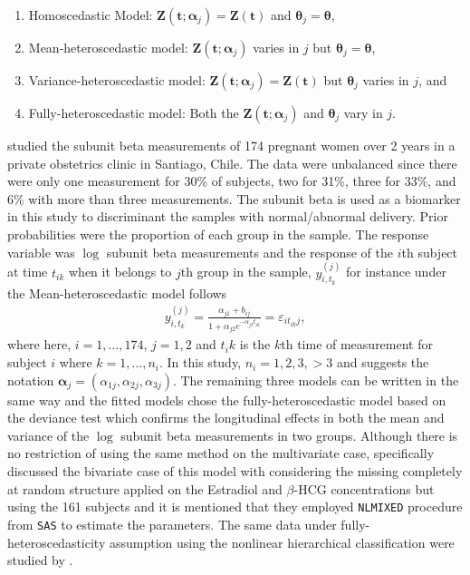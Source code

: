 \documentclass[]{article}
\begin{document}
		\begin{enumerate}
			\item Homoscedastic Model: $\mathbf{Z}(\textbf{t};\boldsymbol{\alpha}_j)=\mathbf{Z}(\textbf{t})$ and $\boldsymbol{\theta}_j=\boldsymbol{\theta}$,
			\item Mean-heteroscedastic model: $\mathbf{Z}(\textbf{t};\boldsymbol{\alpha}_j)$ varies in $j$ but  $\boldsymbol{\theta}_j=\boldsymbol{\theta}$,
			\item Variance-heteroscedastic model: $\mathbf{Z}(\textbf{t};\boldsymbol{\alpha}_j)=\mathbf{Z}(\textbf{t})$ but $\boldsymbol{\theta}_j$ varies in $j$, and
			\item Fully-heteroscedastic model: Both the $\mathbf{Z}(\textbf{t};\boldsymbol{\alpha}_j)$ and $\boldsymbol{\theta}_j$ vary in $j$. 
		\end{enumerate}
		\cite{Marshall2000} studied the subunit beta measurements of 174 pregnant women over 2 years in a private obstetrics clinic in Santiago, Chile. The data were unbalanced since there were only one measurement for 30\% of subjects, two for 31\%, three for 33\%, and 6\%  with more than three measurements. The subunit beta is used as a biomarker in this study to discriminant the samples with normal/abnormal delivery. Prior probabilities were the proportion of each group in the sample. The response variable was $\log$ subunit beta measurements and the response of the $i$th subject at time $t_{ik}$ when it belongs to $j$th group in the sample, $y_{i,t_k}^{(j)}$ for instance under the Mean-heteroscedastic model follows
		\begin{eqnarray*}
			y_{i,t_k}^{(j)}=\frac{\alpha_{j1}+b_{ij}}{1+\alpha_{j2}e^{-\alpha_{j3}t_{ik}}}=\varepsilon_{it_{ik}j}, 
		\end{eqnarray*}
		where here, $i=1,\ldots,174$, $j=1,2$ and $t_ik$ is the $k$th time of measurement for subject $i$ where $k=1,\ldots,n_i$. In this study, $n_i=1,2,3,>3$ and suggests the notation $\boldsymbol{\alpha}_j=(\alpha_{1j},\alpha_{2j},\alpha_{3j})$. The remaining three models can be written in the same way and the fitted models chose the fully-heteroscedastic model based on the deviance test which confirms the longitudinal effects in both the mean and variance of the $\log$ subunit beta measurements in two groups. Although there is no restriction of using the same method on the multivariate case, \cite{Marshall2009} specifically discussed the bivariate case of this model with considering the missing completely at random structure applied on the  Estradiol and $\beta$-HCG concentrations but using the 161 subjects and it is mentioned that they employed \texttt{NLMIXED} procedure from \texttt{SAS} to estimate the parameters. The same data under fully-heteroscedasticity assumption using the nonlinear hierarchical classification were studied by \cite{delaCruzMesia2007}. 
		
\end{document}
